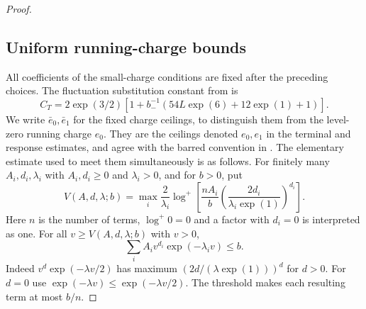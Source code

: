 \begin{proof}
\subsection{Uniform running-charge bounds}

All coefficients of the small-charge conditions are
fixed after the preceding choices. The fluctuation substitution
constant from \cite[Section~1]{NonlinearStep} is
\[
 C_T=2\exp(3/2)
       [1+b_-^{-1}(54L\exp(6)+12\exp(1)+1)].
\]
We write $\bar e_0,\bar e_1$ for the fixed charge ceilings,
to distinguish them from the level-zero running charge $e_0$.
They are the ceilings denoted $e_0,e_1$ in the terminal and
response estimates, and agree with the barred convention in
\cite{CoverTuning}. The elementary
estimate used to meet them simultaneously is as follows.
For finitely many $A_i,d_i,\lambda_i$ with
$A_i,d_i\ge0$ and $\lambda_i>0$, and for $b>0$, put
\begin{equation}\label{eq:constants-tail-threshold}
 V(A,d,\lambda;b)
   =\max_i\frac2{\lambda_i}
       \log^+\left[
         \frac{nA_i}{b}
         \left(\frac{2d_i}{\lambda_i\exp(1)}\right)^{d_i}
       \right].
\end{equation}
Here $n$ is the number of terms, $\log^+0=0$
and a factor with $d_i=0$ is interpreted as one.
For all $v\ge V(A,d,\lambda;b)$ with $v>0$,
\begin{equation}\label{eq:constants-tail-bound}
 \sum_i A_iv^{d_i}\exp(-\lambda_iv)\le b.
\end{equation}
Indeed $v^d\exp(-\lambda v/2)$ has maximum
$(2d/(\lambda\exp(1)))^d$ for $d>0$.
For $d=0$ use $\exp(-\lambda v)\le\exp(-\lambda v/2)$.
The threshold makes each resulting term at most $b/n$.


\end{proof}
